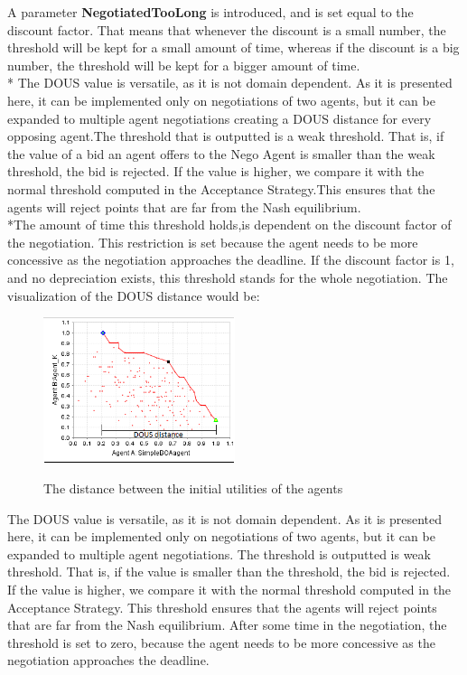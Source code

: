 \documentclass[html]{report}    %
\begin{document}
 A parameter \textbf{NegotiatedTooLong} is introduced, and is set equal to the discount factor. That means that whenever the discount is a small number, the threshold will be kept for a small amount of time, whereas if the discount is a big number, the threshold will be kept for a bigger amount of time.
\\* The DOUS value is versatile, as it is not domain dependent.
As it is presented here, it can be implemented only on negotiations of two agents, but it can be expanded to multiple agent negotiations creating a DOUS distance for every opposing agent.The threshold that is outputted is a weak threshold. That is, if the value of a bid an agent offers to the Nego Agent is smaller than the weak threshold, the bid is rejected. If the value is higher, we compare it with the normal threshold computed in the Acceptance Strategy.This ensures that the agents will reject points that are far from the Nash equilibrium.
\\*The amount of time this threshold holds,is dependent on the discount factor of the negotiation. This restriction is set because the agent needs to be more concessive as the negotiation approaches the deadline. If the discount factor is 1, and no depreciation exists, this threshold stands for the whole negotiation. 
The visualization of the DOUS distance would be:

\begin{figure}[htbp]
  \caption{The distance between the initial utilities of the agents}
  \centering
    \includegraphics[width=0.5\textwidth]{dous}
    \label{3}
\end{figure}

The DOUS value is versatile, as it is not domain dependent.
As it is presented here, it can be implemented only on negotiations of two agents, but it can be expanded to multiple agent negotiations.
The threshold is outputted is weak threshold.
That is, if the value is smaller than the threshold, the bid is rejected. If the value is higher, we compare it with the normal threshold computed in the Acceptance Strategy.
This threshold ensures that the agents will reject points that are far from the Nash equilibrium.
After some time in the negotiation, the threshold is set to zero, because the agent needs to be more concessive as the negotiation approaches the deadline. 
\end{document}
